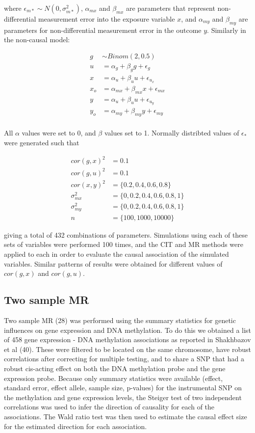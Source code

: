 \documentclass[]{article}
\begin{document}
where \(\epsilon_{m*} \sim N(0, \sigma^2_{m*})\), \(\alpha_{mx}\) and
\(\beta_{mx}\) are parameters that represent non-differential
measurement error into the exposure variable \(x\), and \(\alpha_{my}\)
and \(\beta_{my}\) are parameters for non-differential measurement error
in the outcome \(y\). Similarly in the non-causal model:

\[
\begin{aligned}
g & \sim Binom(2, 0.5) \\
u & = \alpha_g + \beta_g g + \epsilon_g \\
x & = \alpha_u + \beta_u u + \epsilon_{u_x} \\
x_o & = \alpha_{mx} + \beta_{mx} x + \epsilon_{mx} \\
y & = \alpha_u + \beta_u u + \epsilon_{u_y} \\
y_o & = \alpha_{my} + \beta_{my} y + \epsilon_{my} \\
\end{aligned}
\]

All \(\alpha\) values were set to 0, and \(\beta\) values set to 1.
Normally distribted values of \(\epsilon_*\) were generated such that

\[
\begin{aligned}
cor(g, x)^2 & = 0.1 \\
cor(g, u)^2 & = 0.1 \\
cor(x, y)^2 & = \{0.2, 0.4, 0.6, 0.8\} \\
\sigma^2_{mx} & = \{0, 0.2, 0.4, 0.6, 0.8, 1\} \\
\sigma^2_{my} & = \{0, 0.2, 0.4, 0.6, 0.8, 1\} \\
n & = \{100, 1000, 10000\}
\end{aligned}
\]

giving a total of 432 combinations of parameters. Simulations using each
of these sets of variables were performed 100 times, and the CIT and MR
methods were applied to each in order to evaluate the causal association
of the simulated variables. Similar patterns of results were obtained
for different values of \(cor(g, x)\) and \(cor(g, u)\).

\subsection{Two sample MR}\label{two-sample-mr}

Two sample MR (28) was performed using the summary statistics for
genetic influences on gene expression and DNA methylation. To do this we
obtained a list of 458 gene expression - DNA methylation associations as
reported in Shakhbazov et al (40). These were filtered to be located on
the same chromosome, have robust correlations after correcting for
multiple testing, and to share a SNP that had a robust cis-acting effect
on both the DNA methylation probe and the gene expression probe. Because
only summary statistics were available (effect, standard error, effect
allele, sample size, p-values) for the instrumental SNP on the
methylation and gene expression levels, the Steiger test of two
independent correlations was used to infer the direction of causality
for each of the associations. The Wald ratio test was then used to
estimate the causal effect size for the estimated direction for each
association.
\end{document}
